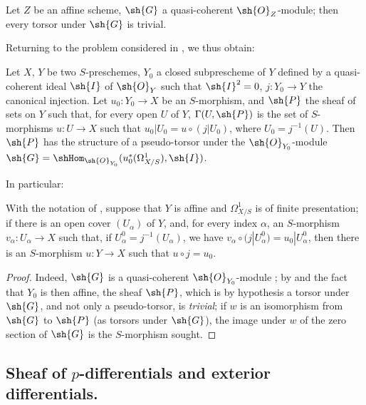 \begin{proposition}[16.5.16]
\label{IV.16.5.16}
Let $Z$ be an affine scheme, $\sh{G}$ a quasi-coherent $\sh{O}_Z$-module;
then every torsor under $\sh{G}$ is trivial.
\end{proposition}

Returning to the problem considered in , we thus obtain:

\begin{proposition}[16.5.17]
\label{IV.16.5.17}
Let $X$, $Y$ be two $S$-preschemes, $Y_0$ a closed subprescheme of $Y$ defined by a quasi-coherent ideal $\sh{I}$ of $\sh{O}_Y$ such that $\sh{I}^2 = 0$, $j : Y_0 \to Y$ the canonical injection.
Let $u_0:Y_0 \to X$ be an $S$-morphism, and $\sh{P}$ the sheaf of sets on $Y$ such that, for every open $U$ of $Y$, $\Gamma(U, \sh{P})$ is the set of $S$-morphisms $u : U \to X$ such that $u_0|U_0 = u \circ (j|U_0)$, where $U_0 = j^{-1}(U)$.
Then $\sh{P}$ has the structure of a pseudo-torsor under the $\sh{O}_{Y_0}$-module $\sh{G} = \shHom_{\sh{O}_{Y_0}}(u_0^*(\Omega_{X/S}^1), \sh{I})$.
\end{proposition}

In particular:

\begin{corollary}[16.5.18]
\label{IV.16.5.18}
With the notation of , suppose that $Y$ is affine and $\Omega_{X/S}^1$ is of finite presentation;
if there is an open cover $(U_\alpha)$ of $Y$, and, for every index $\alpha$, an $S$-morphism $v_\alpha : U_\alpha \to X$ such that, if $U_\alpha^0 = j^{-1}(U_\alpha)$, we have $v_\alpha \circ (j|U_\alpha^0) = u_0|U_\alpha^0$, then there is an $S$-morphism $u : Y \to X$ such that $u \circ j = u_0$.
\end{corollary}

\begin{proof}
Indeed, $\sh{G}$ is a quasi-coherent $\sh{O}_{Y_0}$-module ;
by  and the fact that $Y_0$ is then affine, the sheaf $\sh{P}$, which is by hypothesis a torsor under $\sh{G}$, and not only a pseudo-torsor, is \emph{trivial};
if $w$ is an isomorphism from $\sh{G}$ to $\sh{P}$ (as torsors under $\sh{G}$), the image under $w$ of the zero section of $\sh{G}$ is the $S$-morphism sought.
\end{proof}

\subsection{Sheaf of $p$-differentials and exterior differentials.}
\label{IV.16.6}

